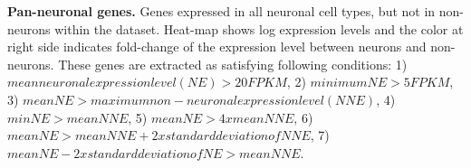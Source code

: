 \textbf{Pan-neuronal genes.} 
Genes expressed in all neuronal cell types, but not in non-neurons within the dataset. Heat-map shows log expression levels and the color at right side indicates fold-change of the expression level between neurons and non-neurons. These genes are extracted as satisfying following conditions: 1) $mean neuronal expression level (NE)> 20FPKM$, 2) $minimum NE > 5FPKM$, 3) $mean NE > maximum non-neuronal expression level (NNE)$, 4) $min NE > mean NNE$, 5) $mean NE > 4x mean NNE$, 6) $mean NE > mean NNE + 2x standard deviation of NNE$, 7) $mean NE - 2x standard deviation of NE > mean NNE$. 



